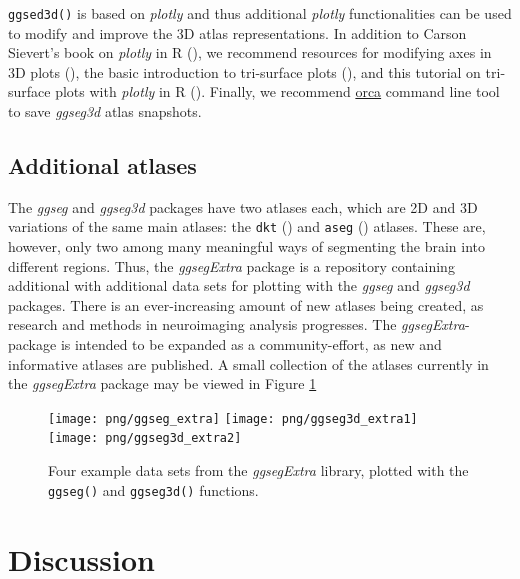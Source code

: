 \documentclass[fleqn,10pt]{wlpeerj} %
\begin{document}
\texttt{ggsed3d()} is based on \emph{plotly} and thus additional \emph{plotly} functionalities can be used to modify and improve the 3D atlas representations.
In addition to Carson Sievert's book on \emph{plotly} in R (\citeyearpar{plotly}), we recommend resources for modifying axes in 3D plots (\citet{plotly-ax}), the basic introduction to tri-surface plots (\citet{plotly-tri}), and this tutorial on tri-surface plots with \emph{plotly} in R (\citet{plotly-trisurf}).
Finally, we recommend \href{https://github.com/plotly/orca\#installation}{orca} command line tool to save \emph{ggseg3d} atlas snapshots.

\hypertarget{additional-atlases}{%
\subsection{Additional atlases}\label{additional-atlases}}

The \emph{ggseg} and \emph{ggseg3d} packages have two atlases each, which are 2D and 3D variations of the same main atlases: the \texttt{dkt} (\citet{dkt}) and \texttt{aseg} (\citet{aseg}) atlases.
These are, however, only two among many meaningful ways of segmenting the brain into different regions.
Thus, the \emph{ggsegExtra} package is a repository containing additional with additional data sets for plotting with the \emph{ggseg} and \emph{ggseg3d} packages.
There is an ever-increasing amount of new atlases being created, as research and methods in neuroimaging analysis progresses.
The \emph{ggsegExtra}-package is intended to be expanded as a community-effort, as new and informative atlases are published.
A small collection of the atlases currently in the \emph{ggsegExtra} package may be viewed in Figure \ref{fig:ggsegExtra}



\begin{figure}[H]
\texttt{[image: png/ggseg\_extra]} \texttt{[image: png/ggseg3d\_extra1]} \texttt{[image: png/ggseg3d\_extra2]} \caption{Four example data sets from the \emph{ggsegExtra} library, plotted with the \texttt{ggseg()} and \texttt{ggseg3d()} functions.}\label{fig:ggsegExtra}
\end{figure}

\hypertarget{discussion}{%
\section{Discussion}\label{discussion}}
\end{document}
